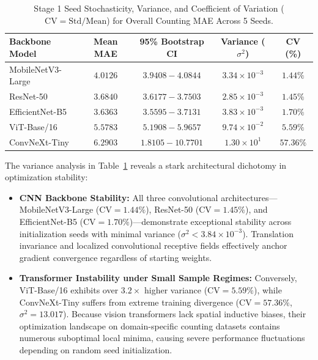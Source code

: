 \documentclass[a4paper,fleqn]{cas-sc}
\begin{document}
\begin{table}[h]
\centering
\footnotesize
\setlength{\tabcolsep}{4pt}
\renewcommand{\arraystretch}{1.1}
\caption{Stage 1 Seed Stochasticity, Variance, and Coefficient of Variation ($\text{CV} = \text{Std} / \text{Mean}$) for Overall Counting MAE Across 5 Seeds.}
\label{tab:stage1_seed_variance}
\begin{tabular}{lcccc}
\toprule
\textbf{Backbone Model} & \textbf{Mean MAE} & \textbf{95\% Bootstrap CI} & \textbf{Variance ($\sigma^2$)} & \textbf{CV (\%)} \\
\midrule
MobileNetV3-Large \cite{mobilenet} & $4.0126$ & $3.9408 - 4.0844$ & $3.34 \times 10^{-3}$ & $\mathbf{1.44\%}$ \\
ResNet-50 \cite{resnet} & $3.6840$ & $3.6177 - 3.7503$ & $2.85 \times 10^{-3}$ & $1.45\%$ \\
EfficientNet-B5 \cite{efficientnet} & $\mathbf{3.6363}$ & $\mathbf{3.5595 - 3.7131}$ & $3.83 \times 10^{-3}$ & $1.70\%$ \\
ViT-Base/16 \cite{vit} & $5.5783$ & $5.1908 - 5.9657$ & $9.74 \times 10^{-2}$ & $5.59\%$ \\
ConvNeXt-Tiny \cite{convnext} & $6.2903$ & $1.8105 - 10.7701$ & $1.30 \times 10^{1}$ & $57.36\%$ \\
\bottomrule
\end{tabular}%
\end{table}

The variance analysis in Table~\ref{tab:stage1_seed_variance} reveals a stark architectural dichotomy in optimization stability:
\begin{itemize}
    \item \textbf{CNN Backbone Stability:} All three convolutional architectures—MobileNetV3-Large ($\text{CV} = 1.44\%$), ResNet-50 ($\text{CV} = 1.45\%$), and EfficientNet-B5 ($\text{CV} = 1.70\%$)—demonstrate exceptional stability across initialization seeds with minimal variance ($\sigma^2 < 3.84 \times 10^{-3}$). Translation invariance and localized convolutional receptive fields effectively anchor gradient convergence regardless of starting weights.
    \item \textbf{Transformer Instability under Small Sample Regimes:} Conversely, ViT-Base/16 exhibits over $3.2\times$ higher variance ($\text{CV} = 5.59\%$), while ConvNeXt-Tiny suffers from extreme training divergence ($\text{CV} = 57.36\%$, $\sigma^2 = 13.017$). Because vision transformers lack spatial inductive biases, their optimization landscape on domain-specific counting datasets contains numerous suboptimal local minima, causing severe performance fluctuations depending on random seed initialization.
\end{itemize}
\end{document}
